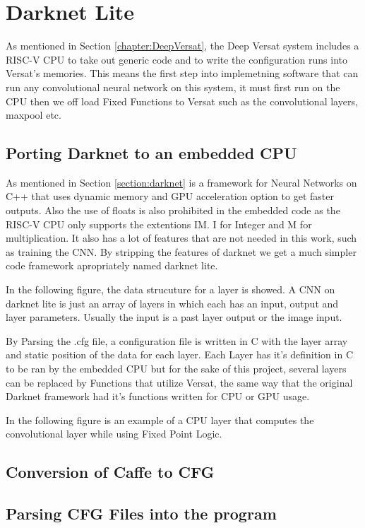 \chapter{Darknet Lite}
\label{chapter:Darknet}

As mentioned in Section \ref{chapter:DeepVersat}, the Deep Versat system includes a RISC-V CPU to take out generic
code and to write the configuration runs into Versat's memories. This means the first step into implemetning software
that can run any convolutional neural network on this system, it must first run on the CPU then we off load Fixed Functions 
to Versat such as the convolutional layers, maxpool etc.

\section{Porting Darknet to an embedded CPU}

As mentioned in Section \ref{section:darknet} is a framework for Neural Networks on C++ that uses dynamic memory 
and GPU acceleration option to get faster outputs.
Also the use of floats is also prohibited in the embedded code
as the RISC-V CPU only supports the extentions IM. I for Integer and M for multiplication.
It also has a lot of features that are not needed in this work, such as training the CNN.
By stripping the features of darknet we get a much simpler
code framework apropriately named darknet lite.

In the following figure, 
the data strucuture for a layer is showed. A CNN on darknet lite is just an array of layers in which each has an input, 
output and layer parameters. 
Usually the input is a past layer output or the image input.



By Parsing the .cfg file, a configuration file is written in C with the layer array and static position of the data for each layer. 
Each Layer has it's definition in C to be ran by the embedded CPU but for the sake of this project, several layers can be
replaced by Functions that utilize Versat, the same way that the original Darknet framework had it's functions written for CPU or GPU usage.

In the following figure is an example of a CPU layer that computes the convolutional layer while using Fixed Point Logic.




\section{Conversion of Caffe to CFG}



\section{Parsing CFG Files into the program}